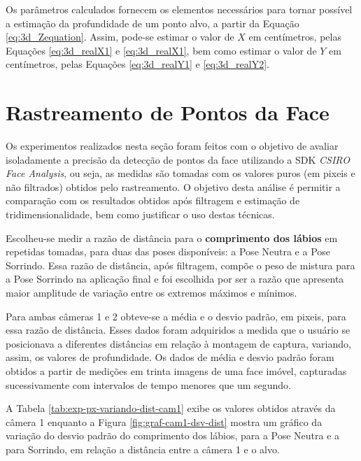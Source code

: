 Os parâmetros calculados fornecem os elementos necessários para tornar possível
a estimação da profundidade de um ponto alvo, a partir da Equação
\ref{eq:3d_Zequation}. Assim, pode-se estimar o valor de $X$ em centímetros,
pelas Equações \ref{eq:3d_realX1} e \ref{eq:3d_realX1}, bem como estimar o valor
de $Y$ em centímetros, pelas Equações \ref{eq:3d_realY1} e \ref{eq:3d_realY2}.

\section{Rastreamento de Pontos da Face}

Os experimentos realizados nesta seção foram feitos com o objetivo de avaliar
isoladamente a precisão da detecção de pontos da face utilizando a SDK
\textit{CSIRO Face Analysis}, ou seja, as medidas são tomadas com os valores
puros (em pixeis e não filtrados) obtidos pelo rastreamento. O objetivo desta
análise é permitir a comparação com os resultados obtidos após filtragem e
estimação de tridimensionalidade, bem como justificar o uso destas técnicas.


Escolheu-se medir a razão de distância para o \textbf{comprimento dos lábios} em
repetidas tomadas, para duas das poses disponíveis: a Pose Neutra e a Pose
Sorrindo. Essa razão de distância, após filtragem, compõe o peso de mistura para
a Pose Sorrindo na aplicação final e foi escolhida por ser a razão que apresenta
maior amplitude de variação entre os extremos máximos e mínimos.

Para ambas câmeras 1 e 2 obteve-se a média e o desvio padrão, em pixeis, para
essa razão de distância. Esses dados foram adquiridos a medida que o usuário se
posicionava a diferentes distâncias em relação à montagem de captura, variando,
assim, os valores de profundidade. Os dados de média e desvio padrão foram
obtidos a partir de medições em trinta imagens de uma face imóvel, capturadas
sucessivamente com intervalos de tempo menores que um segundo.

A Tabela \ref{tab:exp-px-variando-dist-cam1} exibe os valores obtidos através da
câmera 1 enquanto a Figura \ref{fig:graf-cam1-dsv-dist} mostra um gráfico da
variação do desvio padrão do comprimento dos lábios, para a Pose Neutra e a para
Sorrindo, em relação a distância entre a câmera 1 e o alvo.


